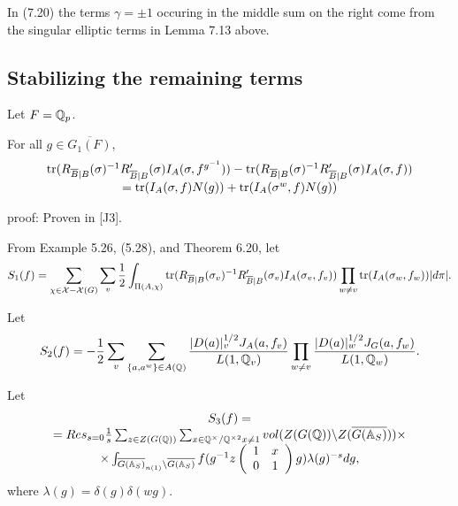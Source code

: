 In (7.20) the terms $\gamma =\pm 1$ occuring
in the middle sum on the right
come from the singular elliptic terms in Lemma 7.13 above.

\subsection{Stabilizing the remaining terms}

Let $F=\mathbb{Q} _p$.

\begin{lemma} For all $g\in \overline{G_1(F)}$,
\[
\begin{array}{c}
{\rm tr}(R_{\overline{B}|B}(\sigma)^{-1}
R'_{\overline{B}|B}(\sigma)I_A(\sigma,f^{g^{-1}}))
-{\rm tr}(R_{\overline{B}|B}(\sigma)^{-1}
R'_{\overline{B}|B}(\sigma)I_A(\sigma,f))\\
={\rm tr}(I_A(\sigma,f)N(g))+{\rm tr}(I_A(\sigma^w,f)N(g))
\end{array}
\]
\end{lemma}

proof: Proven in [J3].

From Example 5.26, (5.28), and Theorem 6.20, let
\begin{equation}
S_1(f)=\sum_{\chi\in{\cal{X}}-{\cal{X}}(G)}
\sum_v {1\over 2}
\int_{\Pi(A,\chi)}
{\rm tr}(R_{\overline{B}|B}(\sigma_v)^{-1}
R'_{\overline{B}|B}(\sigma_v)I_A(\sigma_v,f_v))
\prod_{w\not= v}
{\rm tr}(I_A(\sigma_w,f_w))|d\pi |.
\end{equation}

Let
\begin{equation}
S_2(f)=
-{1\over 2}
\sum_v \sum_{\{a,a^w\}\in A(\mathbb{Q} )}
{|D(a)|^{1/2}_v
J_A(a,f_v)\over L(1,\mathbb{Q} _v)}
\prod_{w\not= v}
{|D(a)|^{1/2}_w J_G(a,f_w)\over L(1,\mathbb{Q} _w)}.
\end{equation}

Let
\begin{equation}
\begin{array}{c}
S_3(f)=\\
=Res_{s=0}{1\over s}
\sum_{z\in Z(G(\mathbb{Q} ))}
\sum_{
x\in \mathbb{Q} ^\times /\mathbb{Q} ^{\times 2}
x\not= 1 }
vol(Z(G(\mathbb{Q} ))\backslash Z(\overline{G(\mathbb{A} _S)}))\times \\
\times
\int_{\overline{G(\mathbb{A} _S)}_{n(1)}
\backslash \overline{G(\mathbb{A} _S)}}
f(g^{-1}z
\left(
\begin{array}{cc}
1&x\\ 0&1
\end{array}
\right)
 g)\lambda(g)^{-s}dg ,
\end{array}
\end{equation}
where $\lambda(g)=\delta(g)\delta(wg)$.

